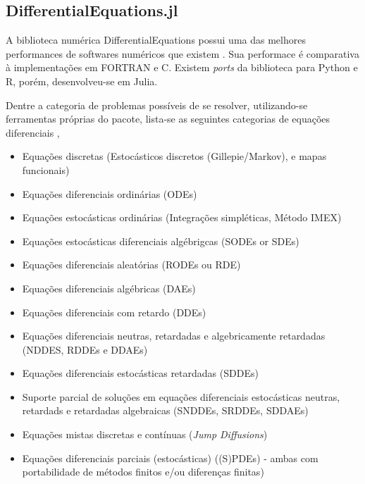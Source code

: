 \documentclass[
12pt,				%
openright,			%
oneside,			%
a4paper,			%
english,			%
french,				%
spanish,			%
brazil,				%
]{abntex2}
\begin{document}
\subsection{DifferentialEquations.jl}

A biblioteca numérica DifferentialEquations possui uma das melhores performances de softwares numéricos que existem \cite{rackauckas2017differentialequations}. Sua performace é comparativa à implementações em FORTRAN e C. Existem \textit{ports} da biblioteca para Python e R, porém, desenvolveu-se em Julia.

Dentre a categoria de problemas possíveis de se resolver, utilizando-se ferramentas próprias do pacote, lista-se  as seguintes categorias de equações diferenciais \cite{rackauckas2019confederated,rackauckas2017adaptive,rackauckas_stability-optimized_2018,sykora2020stochasticdelaydiffeq,rackauckas2018comparison,rackauckas2019diffeqflux,rackauckas2020universal,gowda2019sparsity,ma2021modelingtoolkit},

\begin{itemize}
\item Equações discretas (Estocásticos discretos (Gillepie/Markov), e mapas funcionais)
\item Equações diferenciais ordinárias (ODEs)
\item Equações estocásticas ordinárias (Integrações simpléticas, Método IMEX)
\item Equações estocásticas diferenciais algébrigcas (SODEs or SDEs)
\item Equações diferenciais aleatórias (RODEs ou RDE)
\item Equações diferenciais algébricas (DAEs)
\item Equações diferenciais com retardo (DDEs)
\item Equações diferenciais neutras, retardadas e algebricamente retardadas (NDDES, RDDEs e DDAEs)
\item Equações diferenciais estocásticas retardadas (SDDEs)
\item Suporte parcial de soluções em equações diferenciais estocásticas neutras, retardads e retardadas algebraicas (SNDDEs, SRDDEs, SDDAEs)
\item Equações mistas discretas e contínuas (\textit{Jump Diffusions})
\item Equações diferenciais parciais (estocásticas) ((S)PDEs) - ambas com portabilidade de métodos finitos e/ou diferenças finitas)
\end{itemize}
\end{document}
